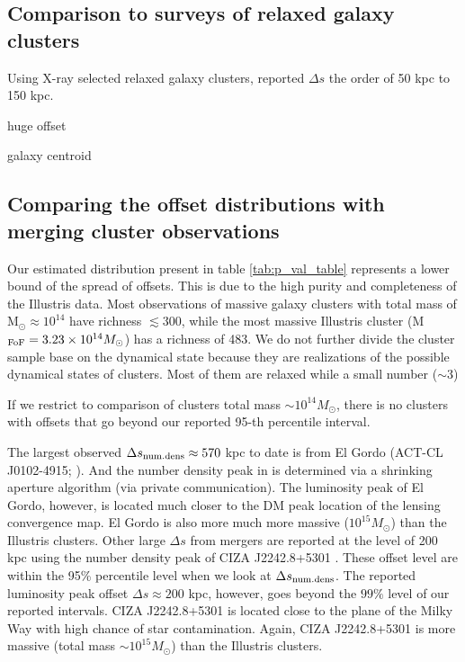 \subsection{Comparison to surveys of relaxed galaxy clusters}
Using X-ray selected relaxed galaxy clusters, 
\citep{George2012a} reported $\Delta s$ the order of 50 kpc to 150 kpc. 

huge offset

galaxy centroid 

\subsection{Comparing the offset distributions with merging cluster observations}

Our estimated distribution present in table \ref{tab:p_val_table}
represents a lower bound of the spread of offsets.
This is due to the high purity and completeness of the Illustris data.
Most observations of massive galaxy clusters with total mass of M$_\odot
\approx 10^{14}$ have richness $\lesssim 300$, while the most massive Illustris
cluster (M$_{\rm FoF} = 3.23 \times 10^{14} M_\odot$) has a richness of 483.
We do not further divide the cluster sample base on the dynamical state because
they are realizations of the possible dynamical states of clusters.
Most of them are relaxed while a small number ($\sim 3$)


If we restrict to comparison of clusters total mass $\sim 10^{14} M_{\odot}$,
there is no clusters with offsets 
that go beyond our reported 95-th percentile interval.  

The largest observed $\Delta s_{\rm num. dens} \approx 570$ 
kpc to date is from El Gordo (ACT-CL J0102-4915; \citealt{Jee2014}). 
And the number density peak in \citep{Jee2014} is determined via a shrinking 
aperture algorithm (via private communication).
The luminosity peak of El Gordo, however, is located much closer 
to the DM peak location of the lensing convergence map.
El Gordo is also more much more massive ($10^{15} M_{\odot}$) than the Illustris
clusters.
Other large $\Delta s$ from mergers are reported at the level of 200 kpc 
using the number density peak of CIZA J2242.8+5301 \citep{Jee2015}
. These offset level are within the 95\% percentile level 
when we look at $\Delta s_{\rm num. dens}$. The reported 
luminosity peak offset $\Delta
s \approx 200$ kpc, however, goes beyond the $99\%$ level of our reported
intervals. CIZA J2242.8+5301 is located close to the plane
of the Milky Way with high chance of star contamination. 
Again, CIZA J2242.8+5301 is more massive (total mass $\sim 10^{15} M_{\odot}$) 
than the Illustris clusters.

